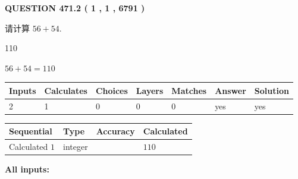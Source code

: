 \documentclass{ctexart}
\begin{document}
   
  
\vspace{0.2in}
  
{\textbf{\Large{QUESTION
471.2 
 ( 1 , 1 , 6791 )
}}}
  
  
 
请计算 $ %
56 +  %
54 $.
 
 
 
\noindent{}
 
 

110
 
 
\noindent{}
 
 

 
 
 
\noindent{}
 
 

$ %
56 +  %
54=   %
110$
 
 
\noindent{}
 
 

 
   
   
   
   
\noindent\begin{tabular}{|l|l|l|l|l|l|l|}
 \hline
Inputs & Calculates & Choices & Layers & Matches & Answer & Solution \\ \hline
 2  & 
 1  & 
 0
  & 
 0  & 
 0  & 
  yes & 
  yes 
  \\ \hline
 \end{tabular}
   
   
   
   
\noindent{}
   
   
  
  
\noindent\begin{tabular}{|l|l|l|l|}
\hline
 Sequential & Type & Accuracy & Calculated \\ 
\hline
 
 
  Calculated $  1 $ & integer &  & 
  $ 110 $ 
 \\  \hline  
 \end{tabular}
   
   
   
   
\noindent\vspace{0.1in}\hspace{-0.08in} {\textbf{\Large{All inputs: }}}
   
\end{document}
